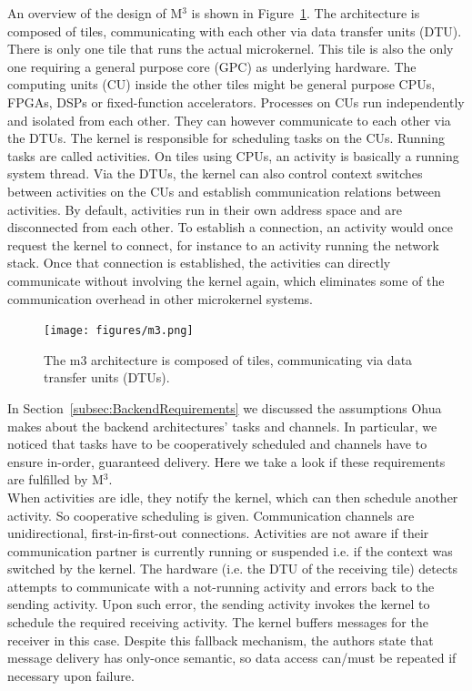 An overview of the design of M$^3$ is shown in Figure~\ref{fig:m3}. The architecture is composed of tiles, communicating with each other via data transfer units (DTU). There is only one tile that runs the actual microkernel. This tile is also the only one requiring a general purpose core (GPC) as underlying hardware. The computing units (CU) inside the other tiles might be general purpose CPUs, FPGAs, DSPs or fixed-function accelerators. Processes on CUs run independently and isolated from each other. They can however communicate to each other via the DTUs. The kernel is responsible for scheduling tasks on the CUs. Running tasks are called activities. On tiles using CPUs, an activity is basically a running system thread. Via the DTUs, the kernel can also control context switches between activities on the CUs and establish communication relations between activities. By default, activities run in their own address space and are disconnected from each other. To establish a connection, an activity  would once request the kernel to connect, for instance to an activity  running the network stack. Once that connection is established, the activities can directly communicate without involving the kernel again, which eliminates some of the communication overhead in other microkernel systems. 

\begin{figure}[H]
    \centering
    \texttt{[image: figures/m3.png]}
    \caption{The m3 architecture is composed of tiles, communicating via data transfer units (DTUs).}
    \label{fig:m3}
\end{figure}

In Section~\ref{subsec:BackendRequirements} we discussed the assumptions Ohua makes about the backend architectures' tasks and channels. In particular, we noticed that tasks have to be cooperatively scheduled and channels have to ensure in-order, guaranteed delivery. Here we take a look if these requirements are fulfilled by M$^3$.\\

When activities are idle, they notify the kernel, which can then schedule another activity. So cooperative scheduling is given. Communication channels are unidirectional, first-in-first-out connections. Activities are not aware if their communication partner is currently running or suspended i.e. if the context was switched by the kernel. The hardware (i.e. the DTU of the receiving tile) detects attempts to communicate with a not-running activity and errors back to the sending activity. Upon such error, the sending activity invokes the kernel to schedule the required receiving activity. The kernel buffers messages for the receiver in this case. Despite this fallback mechanism, the authors state that message delivery has only-once semantic, so data access can/must be repeated if necessary upon failure. 

